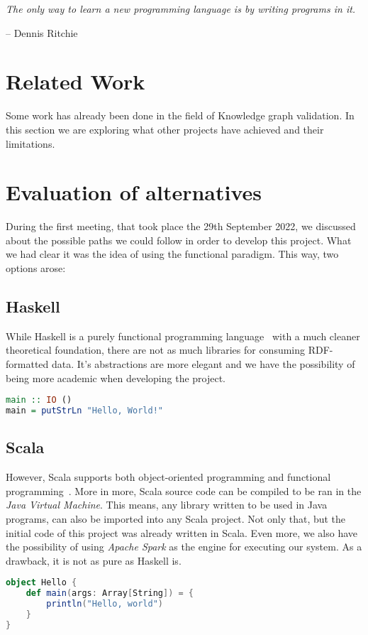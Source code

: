 \epigraph{\textit{The only way to learn a new programming language is by writing programs in it.}}{-- \textup{Dennis Ritchie}}

\section{Related Work}

Some work has already been done in the field of Knowledge graph validation. In this section we are exploring what other projects have achieved and their limitations.

\section{Evaluation of alternatives}

During the first meeting, that took place the 29th September 2022, we discussed about the possible paths we could follow in order to develop this project. What we had clear it was the idea of using the functional paradigm. This way, two options arose:

\subsection{Haskell}

While Haskell is a purely functional programming language~\cite{wiki:Haskell} with a much cleaner theoretical foundation, there are not as much libraries for consuming RDF-formatted data. It's abstractions are more elegant and we have the possibility of being more academic when developing the project.

\begin{lstlisting}[language=Haskell, caption=\textit{Hello World!} program written in Haskell]
main :: IO ()
main = putStrLn "Hello, World!"
\end{lstlisting}

\subsection{Scala}

However, Scala supports both object-oriented programming and functional programming~\cite{wiki:Scala_(programming_language)}. More in more, Scala source code can be compiled to be ran in the \textit{Java Virtual Machine}. This means, any library written to be used in Java programs, can also be imported into any Scala project. Not only that, but the initial code of this project was already written in Scala. Even more, we also have the possibility of using \textit{Apache Spark} as the engine for executing our system. As a drawback, it is not as pure as Haskell is.

\begin{lstlisting}[language=Scala, caption=\textit{Hello World!} program written in Scala 2]
object Hello {
    def main(args: Array[String]) = {
        println("Hello, world")
    }
}
\end{lstlisting}